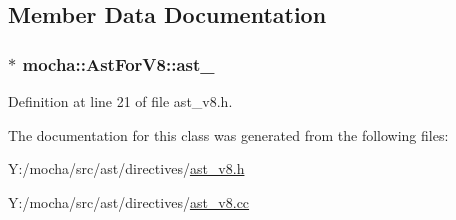 \subsection{Member Data Documentation}
\hypertarget{classmocha_1_1_ast_for_v8_a6b6ad460b87682b4756bced3b31b3476}{
\subsubsection[{ast\_\-}]{$\ast$ {\bf mocha::AstForV8::ast\_\-}}}
\label{classmocha_1_1_ast_for_v8_a6b6ad460b87682b4756bced3b31b3476}


Definition at line 21 of file ast\_\-v8.h.



The documentation for this class was generated from the following files:\begin{DoxyCompactItemize}
\item 
Y:/mocha/src/ast/directives/\hyperlink{ast__v8_8h}{ast\_\-v8.h}\item 
Y:/mocha/src/ast/directives/\hyperlink{ast__v8_8cc}{ast\_\-v8.cc}\end{DoxyCompactItemize}
